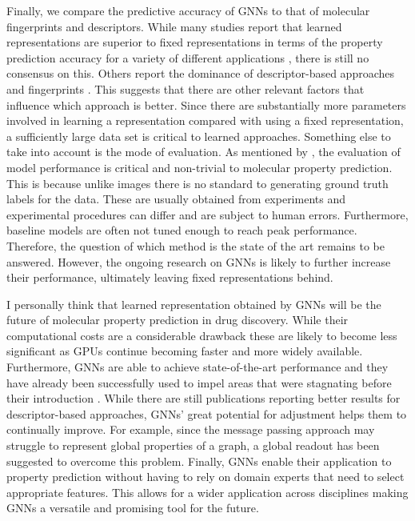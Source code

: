 Finally, we compare the predictive accuracy of GNNs to that of molecular fingerprints and descriptors. While many studies report that learned representations are superior to fixed representations in terms of the property prediction accuracy for a variety of different applications \citep{wu2018moleculenet,yangMPP, korolev}, there is still no consensus on this. Others report the dominance of descriptor-based approaches and fingerprints \citep{mayr, jiang}. This suggests that there are other relevant factors that influence which approach is better. Since there are substantially more parameters involved in learning a representation compared with using a fixed representation, a sufficiently large data set is critical to learned approaches. Something else to take into account is the mode of evaluation. As mentioned by \cite{SHEN201929}, the evaluation of model performance is critical and non-trivial to molecular property prediction. This is because unlike images there is no standard to generating ground truth labels for the data. These are usually obtained from experiments and experimental procedures can differ and are subject to human errors. Furthermore, baseline models are often not tuned enough to reach peak performance. Therefore, the question of which method is the state of the art remains to be answered. However, the ongoing research on GNNs is likely to further increase their performance, ultimately leaving fixed representations behind.


I personally think that learned representation obtained by GNNs will be the future of molecular property prediction in drug discovery. While their computational costs are a considerable drawback these are likely to become less significant as GPUs continue becoming faster and more widely available. Furthermore, GNNs are able to achieve state-of-the-art performance and they have already been successfully used to impel areas that were stagnating before their introduction \citep{STOKES2020688}. While there are still publications reporting better results for descriptor-based approaches, GNNs' great potential for adjustment helps them to continually improve. For example, since the message passing approach may struggle to represent global properties of a graph, a global readout has been suggested \citep{barcelo2019logical} to overcome this problem. Finally, GNNs enable their application to property prediction without having to rely on domain experts that need to select appropriate features. This allows for a wider application across disciplines making GNNs a versatile and promising tool for the future. 


